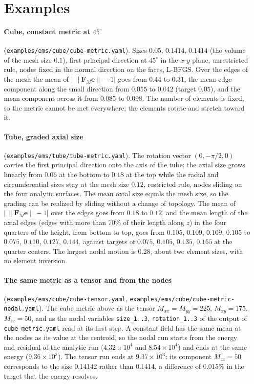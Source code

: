 \documentclass[11pt]{article}
\newcommand{\bs}[1]{\boldsymbol{#1}}
\newcommand{\code}[1]{\texttt{#1}}
\begin{document}
\section{Examples}
\label{sec:examples}

\paragraph{Cube, constant metric at $45^\circ$}
(\code{examples/ems/cube/cube-metric.yaml}). Sizes $0.05$, $0.1414$,
$0.1414$ (the volume of the mesh size $0.1$), first principal direction
at $45^\circ$ in the $x$-$y$ plane, unrestricted rule, nodes fixed in the
normal direction on the faces, L-BFGS. Over the edges of the mesh the mean
of $\lvert\, \lVert \bs F_M \bs e \rVert - 1 \rvert$ goes from $0.44$ to
$0.31$, the mean edge component along the small direction from $0.055$ to
$0.042$ (target $0.05$), and the mean component across it from $0.085$ to
$0.098$. The number of elements is fixed, so the metric cannot be met
everywhere; the elements rotate and stretch toward it.

\paragraph{Tube, graded axial size}
(\code{examples/ems/tube/tube-metric.yaml}). The rotation vector
$(0, -\pi/2, 0)$ carries the first principal direction onto the axis of
the tube; the axial size grows linearly from $0.06$ at the bottom to
$0.18$ at the top while the radial and circumferential sizes stay at the
mesh size $0.12$, restricted rule, nodes sliding on the four analytic
surfaces. The mean axial size equals the mesh size, so the grading can be
realized by sliding without a change of topology. The mean of
$\lvert\, \lVert \bs F_M \bs e \rVert - 1 \rvert$ over the edges goes
from $0.18$ to $0.12$, and the mean length of the axial edges (edges with
more than $70\%$ of their length along $z$) in the four quarters of the
height, from bottom to top, goes from $0.105$, $0.109$, $0.109$, $0.105$
to $0.075$, $0.110$, $0.127$, $0.144$, against targets of $0.075$,
$0.105$, $0.135$, $0.165$ at the quarter centers. The largest nodal motion
is $0.28$, about two element sizes, with no element inversion.

\paragraph{The same metric as a tensor and from the nodes}
(\code{examples/ems/cube/cube-tensor.yaml},
\code{examples/ems/cube/cube-metric-nodal.yaml}). The cube metric above
as the tensor $M_{xx} = M_{yy} = 225$, $M_{xy} = 175$, $M_{zz} = 50$, and
as the nodal variables \code{size\_1..3}, \code{rotation\_1..3} of the
output of \code{cube-metric.yaml} read at its first step. A constant
field has the same mean at the nodes as its value at the centroid, so the
nodal run starts from the energy and residual of the analytic run
($4.32 \times 10^4$ and $8.54 \times 10^4$) and ends at the same energy
($9.36 \times 10^3$). The tensor run ends at $9.37 \times 10^3$: its
component $M_{zz} = 50$ corresponds to the size $0.14142$ rather than
$0.1414$, a difference of $0.015\%$ in the target that the energy
resolves.
\end{document}
